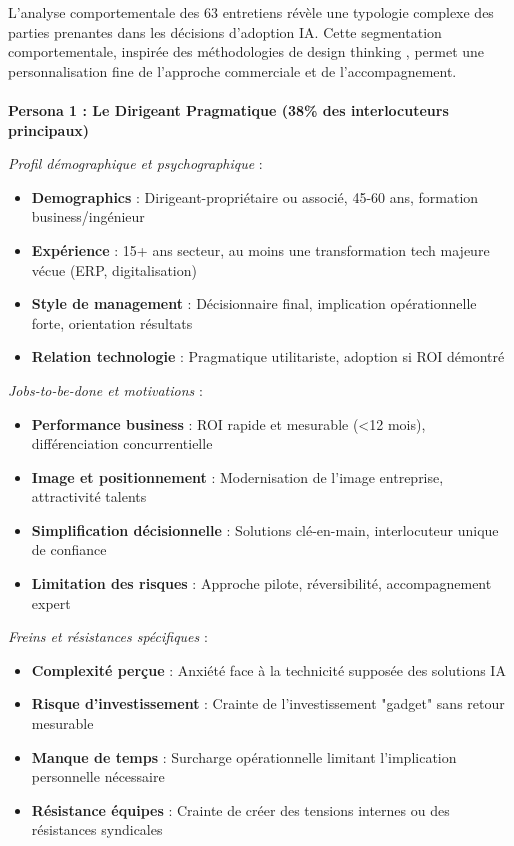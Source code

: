 L'analyse comportementale des 63 entretiens révèle une typologie complexe des parties prenantes dans les décisions d'adoption IA. Cette segmentation comportementale, inspirée des méthodologies de design thinking \cite{brown2009change}, permet une personnalisation fine de l'approche commerciale et de l'accompagnement.
\\\\
\textbf{Persona 1 : Le Dirigeant Pragmatique (38\% des interlocuteurs principaux)}

\emph{Profil démographique et psychographique} :
\begin{itemize}
    \item \textbf{Demographics} : Dirigeant-propriétaire ou associé, 45-60 ans, formation business/ingénieur
    \item \textbf{Expérience} : 15+ ans secteur, au moins une transformation tech majeure vécue (ERP, digitalisation)
    \item \textbf{Style de management} : Décisionnaire final, implication opérationnelle forte, orientation résultats
    \item \textbf{Relation technologie} : Pragmatique utilitariste, adoption si ROI démontré
\end{itemize}
\medskip
\emph{Jobs-to-be-done et motivations} \cite{christensen2016competing} :
\begin{itemize}
    \item \textbf{Performance business} : ROI rapide et mesurable (<12 mois), différenciation concurrentielle
    \item \textbf{Image et positionnement} : Modernisation de l'image entreprise, attractivité talents
    \item \textbf{Simplification décisionnelle} : Solutions clé-en-main, interlocuteur unique de confiance
    \item \textbf{Limitation des risques} : Approche pilote, réversibilité, accompagnement expert
\end{itemize}
\medskip
\emph{Freins et résistances spécifiques} :
\begin{itemize}
    \item \textbf{Complexité perçue} : Anxiété face à la technicité supposée des solutions IA
    \item \textbf{Risque d'investissement} : Crainte de l'investissement "gadget" sans retour mesurable
    \item \textbf{Manque de temps} : Surcharge opérationnelle limitant l'implication personnelle nécessaire
    \item \textbf{Résistance équipes} : Crainte de créer des tensions internes ou des résistances syndicales
\end{itemize}
